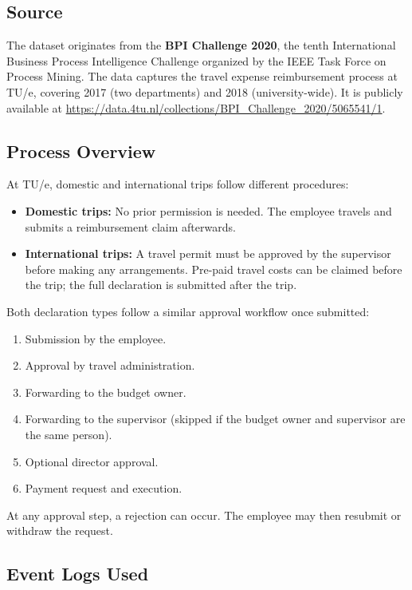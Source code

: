 \documentclass[11pt,a4paper]{article}
\begin{document}
\subsection{Source}

The dataset originates from the \textbf{BPI Challenge 2020}, the tenth International Business Process Intelligence Challenge organized by the IEEE Task Force on Process Mining. The data captures the travel expense reimbursement process at TU/e, covering 2017 (two departments) and 2018 (university-wide). It is publicly available at \url{https://data.4tu.nl/collections/BPI_Challenge_2020/5065541/1}.

\subsection{Process Overview}

At TU/e, domestic and international trips follow different procedures:
\begin{itemize}[leftmargin=*]
    \item \textbf{Domestic trips:} No prior permission is needed. The employee travels and submits a reimbursement claim afterwards.
    \item \textbf{International trips:} A travel permit must be approved by the supervisor before making any arrangements. Pre-paid travel costs can be claimed before the trip; the full declaration is submitted after the trip.
\end{itemize}

Both declaration types follow a similar approval workflow once submitted:
\begin{enumerate}[leftmargin=*]
    \item Submission by the employee.
    \item Approval by travel administration.
    \item Forwarding to the budget owner.
    \item Forwarding to the supervisor (skipped if the budget owner and supervisor are the same person).
    \item Optional director approval.
    \item Payment request and execution.
\end{enumerate}

At any approval step, a rejection can occur. The employee may then resubmit or withdraw the request.

\subsection{Event Logs Used}
\end{document}
